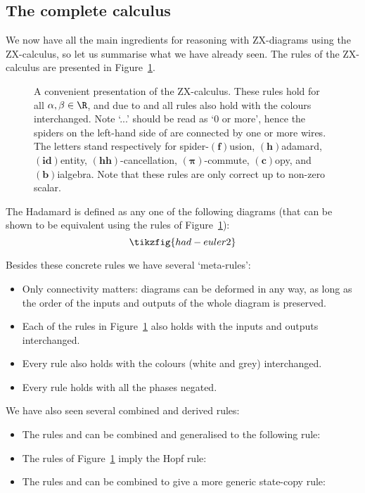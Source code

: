 \documentclass[a4paper,onecolumn,superscriptaddress,11pt,%
				unpublished,%
				allowfontchageintitle,%
				]{quantumarticle}
\begin{document}
\subsection{The complete calculus}\label{sec:complete-calculus}

We now have all the main ingredients for reasoning with ZX-diagrams using the ZX-calculus, so let us summarise what we have already seen. The rules of the ZX-calculus are presented in Figure~\ref{fig:zx-rules}.

\begin{figure}%
\centering
{}
\caption[Rules of the ZX-calculus]{
A convenient presentation of the ZX-calculus. These rules hold for all $\alpha, \beta \in \R$, and due to \HadamardRule and \HHRule all rules also hold with the colours interchanged. Note `...' should be read as `0 or more', hence the spiders on the left-hand side of \SpiderRule are connected by one or more wires.
The letters stand respectively for spider-$(\bm{f})$usion, $(\bm{h})$adamard, $(\bm{id})$entity, $(\bm{hh})$-cancellation, $(\bm{\pi})$-commute, $(\bm{c})$opy, and $(\bm{b})$ialgebra. Note that these rules are only correct up to non-zero scalar.
}
\label{fig:zx-rules}
\end{figure}

The Hadamard is defined as any one of the following diagrams (that can be shown to be equivalent using the rules of Figure~\ref{fig:zx-rules}):
\begin{equation*}
	\tikzfig{had-euler2}
\end{equation*}

Besides these concrete rules we have several `meta-rules':
\begin{itemize}
	\item Only connectivity matters: diagrams can be deformed in any way, as long as the order of the inputs and outputs of the whole diagram is preserved.
	\item Each of the rules in Figure~\ref{fig:zx-rules} also holds with the inputs and outputs interchanged.
	\item Every rule also holds with the colours (white and grey) interchanged.
	\item Every rule holds with all the phases negated.
\end{itemize}

We have also seen several combined and derived rules:
\begin{itemize}	
 	\item The rules \CopyRule and \BialgRule can be combined and generalised to the following rule:
	\item The rules of Figure~\ref{fig:zx-rules} imply the Hopf rule:
	\item The rules \PiRule and \CopyRule can be combined to give a more generic state-copy rule:
\end{itemize}
\end{document}
